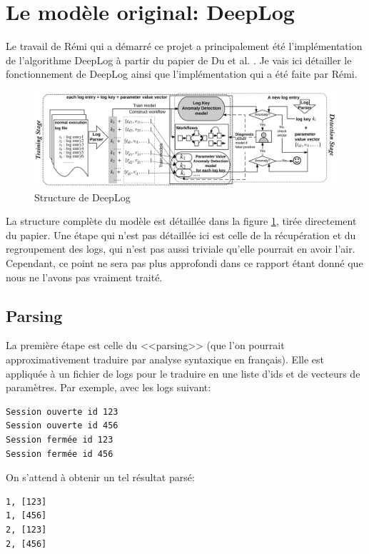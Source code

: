 \documentclass[openany, 11pt]{memoir}
\begin{document}
\section{Le modèle original: DeepLog}

Le travail de Rémi qui a démarré ce projet a principalement été l'implémentation de l'algorithme DeepLog à partir du papier de Du et al. \cite{deeplog}. Je vais ici détailler le fonctionnement de DeepLog ainsi que l'implémentation qui a été faite par Rémi.

\begin{figure}[ht]
	\centering
	\includegraphics[width=\textwidth]{images/deeplog.png}
	\caption{Structure de DeepLog}
	\label{deeplog}
\end{figure}

La structure complète du modèle est détaillée dans la figure \ref{deeplog}, tirée directement du papier. Une étape qui n'est pas détaillée ici est celle de la récupération et du regroupement des \glspl{log}, qui n'est pas aussi triviale qu'elle pourrait en avoir l'air. Cependant, ce point ne sera pas plus approfondi dans ce rapport étant donné que nous ne l'avons pas vraiment traité.

\subsection{Parsing}

La première étape est celle du <<parsing>> (que l'on pourrait approximativement traduire par analyse syntaxique en français). Elle est appliquée à un fichier de \glspl{log} pour le traduire en une liste d'ids et de vecteurs de paramètres. Par exemple, avec les logs suivant:

\begin{lstlisting}
Session ouverte id 123
Session ouverte id 456
Session fermée id 123
Session fermée id 456
\end{lstlisting}

On s'attend à obtenir un tel résultat parsé:

\begin{lstlisting}
1, [123]
1, [456]
2, [123]
2, [456]
\end{lstlisting}
\end{document}
